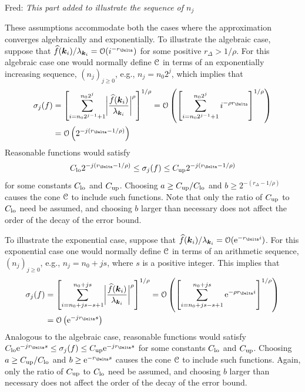 \documentclass[USenglish]{article}
\theoremstyle{dgthm}
\theoremstyle{dgthm}
\theoremstyle{dgthm}
\theoremstyle{dgthm}
\theoremstyle{dgdef}
\theoremstyle{definition}
\newcommand{\hf}{\widehat{f}}
\newcommand{\lo}{\textup{lo}}
\newcommand{\up}{\textup{up}}
\newcommand{\E}{\textup{e}}
\newcommand{\biggabs}[1]{\ensuremath{\biggl \lvert #1 \biggr \rvert}}
\newcommand{\FredNote}[1]{{\color{blue}Fred: #1}}
\begin{document}
\FredNote{\emph{This part added to illustrate the sequence of $n_j$}

These assumptions accommodate both the cases where the approximation converges algebraically and exponentially.  To illustrate the algebraic case, suppose that $\hf(\bsk_i)/\lambda_{\bsk_i} = \calO(i^{-r_\Delta})$ for some positive $r_\Delta > 1/\rho$.  For this algebraic case one would normally define ${\mathcal{C}}$ in terms of an exponentially increasing sequence, $(n_j)_{j\ge 0}$, e.g., $n_j = n_0 2^j$, which implies that 
\begin{align*}
    \sigma_j(f) &= \left[ \sum_{i=n_0 2^{j-1} + 1}^{n_0 2^j} \biggabs{\frac{\hf(\bsk_i)}{\lambda_{\bsk_i}}}^\rho \right]^{1/\rho}
    = \calO \left( \left [ \sum_{i=n_0 2^{j-1} + 1}^{n_0 2^j} i^{-\rho r_\Delta} \right]^{1/\rho} \right) \\
    & = \calO \left(  2^{-j(r_\Delta-1/\rho)} \right)
\end{align*}
Reasonable functions would satisfy 
\begin{equation*}
    C_{\lo} 2^{-j(r_\Delta-1/\rho)} \le \sigma_j(f) \le C_{\up} 2^{-j(r_\Delta-1/\rho)} 
\end{equation*}
for some constants $C_{\lo}$ and $C_{\up}$.  Choosing $a \ge C_{\up}/C_{\lo} $  and $b \ge  2^{-(r_\Delta-1/\rho)}$ causes the cone ${\mathcal{C}}$ to include such functions.  Note that only the ratio of $C_{\up}$ to $C_{\lo}$ need be assumed, and choosing $b$ larger than necessary does not affect the order of the decay of the error bound. 

To illustrate the exponential case, suppose that $\hf(\bsk_i)/\lambda_{\bsk_i} = \calO(\E^{-r_\Delta i})$.  For this exponential case one would normally define ${\mathcal{C}}$ in terms of an arithmetic sequence, $(n_j)_{j\ge 0}$, e.g., $n_j = n_0 + j s$, where $s$ is a positive integer.  This implies that 
\begin{align*}
    \sigma_j(f) &= \left[ \sum_{i=n_0 + j s -s + 1}^{n_0 + j s} \biggabs{\frac{\hf(\bsk_i)}{\lambda_{\bsk_i}}}^\rho \right]^{1/\rho}
    = \calO \left( \left [ \sum_{i=n_0 + j s -s + 1}^{n_0 + j s} \E^{- \rho r_\Delta i} \right]^{1/\rho} \right) \\
    & = \calO \left(  \E^{-j r_{\Delta} s} \right)
\end{align*}
Analogous to the algebraic case, reasonable functions would satisfy 
    $C_{\lo} \E^{-j r_{\Delta} s} \le \sigma_j(f) \le C_{\up} \E^{-j r_{\Delta} s}$
for some constants $C_{\lo}$ and $C_{\up}$.  Choosing $a \ge C_{\up}/C_{\lo} $  and $b \ge \E^{- r_{\Delta} s}$ causes the cone ${\mathcal{C}}$ to include such functions.  Again, only the ratio of $C_{\up}$ to $C_{\lo}$ need be assumed, and choosing $b$ larger than necessary does not affect the order of the decay of the error bound.
}
\end{document}
